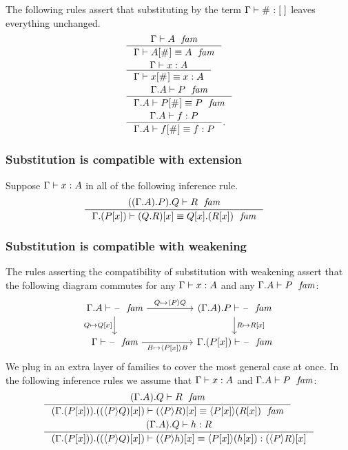 The following rules assert that substituting by the term $\jterm{\Gamma}{\emptyf}{\emptytm}$
leaves everything unchanged.
\begin{align}
& \inference{\jfam{\Gamma}{A}}{\jfameq{\Gamma}{\subst{\emptytm}{A}}{A}}\\
& \inference{\jterm{\Gamma}{A}{x}}{\jtermeq{\Gamma}{A}{\subst{\emptytm}{x}}{x}}\\
& \inference{\jfam{\ctxext{\Gamma}{A}}{P}}{\jfameq{\ctxext{\Gamma}{A}}{\subst{\emptytm}{P}}{P}}\\
& \inference{\jterm{\ctxext{\Gamma}{A}}{P}{f}}{\jtermeq{\ctxext{\Gamma}{A}}{P}{\subst{\emptytm}{f}}{f}}.
\end{align}

\subsubsection{Substitution is compatible with extension}\label{comp-se}
Suppose $\jterm{\Gamma}{A}{x}$ in all of the following inference rule.
\begin{align}
& \inference{\jfam{\ctxext{{{\Gamma}{A}}{P}}{Q}}{R}}
  {\jfameq{\ctxext{\Gamma}{\subst{x}{P}}}{\subst{x}{\ctxext{Q}{R}}}{\ctxext{\subst{x}{Q}}{\subst{x}{R}}}}
\end{align}

\subsubsection{Substitution is compatible with weakening}\label{comp-sw}
The rules asserting the compatibility of substitution with weakening assert
that the following diagram commutes for any $\jterm{\Gamma}{A}{x}$ and any
$\jfam{\ctxext{\Gamma}{A}}{P}$:
\begin{equation*}
\begin{tikzcd}[column sep=huge]
\jfam{\ctxext{\Gamma}{A}}{\blank} \ar{d}[swap]{Q\mapsto\subst{x}{Q}} \ar{r}{Q\mapsto\ctxwk{P}{Q}} & \jfam{\ctxext{{\Gamma}{A}}{P}}{\blank} \ar{d}{R\mapsto\subst{x}{R}}\\ 
\jfam{\Gamma}{\blank} \ar{r}[swap]{B\mapsto\ctxwk{\subst{x}{P}}{B}} & \jfam{\ctxext{\Gamma}{\subst{x}{P}}}{\blank}
\end{tikzcd}
\end{equation*}
We plug in an extra layer of families to cover the most general case at once.
In the following inference rules we assume that $\jterm{\Gamma}{A}{x}$ and
$\jfam{\ctxext{\Gamma}{A}}{P}$:
\begin{align}
& \inference
  {\jfam{\ctxext{{\Gamma}{A}}{Q}}{R}}
  {\jfameq{\ctxext{{\Gamma}{\subst{x}{P}}}{\subst{x}{\ctxwk{P}{Q}}}}{\subst{x}{\ctxwk{P}{R}}}{\ctxwk{\subst{x}{P}}{\subst{x}{R}}}}\label{comp-sw-f}\\
& \inference
    {\jterm{\ctxext{{\Gamma}{A}}{Q}}{R}{h}}
    {\jtermeq
      {\ctxext{{\Gamma}{\subst{x}{P}}}{\subst{x}{\ctxwk{P}{Q}}}}
      {\subst{x}{\ctxwk{P}{R}}}
      {\subst{x}{\ctxwk{P}{h}}}
      {\ctxwk{\subst{x}{P}}{\subst{x}{h}}}}\label{comp-sw-t}
\end{align}

